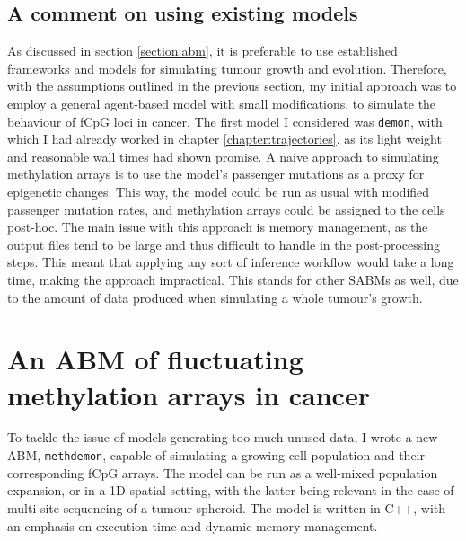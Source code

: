 \subsection{A comment on using existing models}\label{section:old_famework}

As discussed in section \ref{section:abm}, it is preferable to use established
frameworks and models for simulating tumour growth and evolution. Therefore,
with the assumptions outlined in the previous section, my initial approach was
to employ a general agent-based model with small modifications, to simulate the
behaviour of fCpG loci in cancer. The first model I considered was
\texttt{demon}, with which I had already worked in chapter
\ref{chapter:trajectories}, as its light weight and reasonable wall times had
shown promise. A naive approach to simulating methylation arrays is to use the
model's passenger mutations as a proxy for epigenetic changes. This way, the
model could be run as usual with modified passenger mutation rates, and
methylation arrays could be assigned to the cells post-hoc. The main issue with
this approach is memory management, as the output files tend to be large and
thus difficult to handle in the post-processing steps. This meant that applying
any sort of inference workflow would take a long time, making the approach
impractical. This stands for other SABMs as well, due to the amount of data
produced when simulating a whole tumour's growth.

\section{An ABM of fluctuating methylation arrays in
cancer}\label{section:methdemon}
To tackle the issue of models generating too much unused data, I wrote a new
ABM, \texttt{methdemon}, capable of simulating a growing cell population and
their corresponding fCpG arrays. The model can be run as a well-mixed population
expansion, or in a 1D spatial setting, with the latter being relevant in the
case of multi-site sequencing of a tumour spheroid. The model is written in C++,
with an emphasis on execution time and dynamic memory management.

